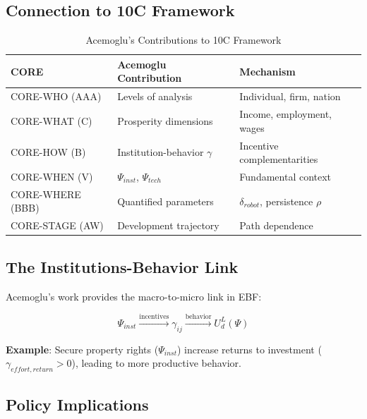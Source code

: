 \subsection{Connection to 10C Framework}

\begin{table}[h]
\centering
\caption{Acemoglu's Contributions to 10C Framework}
\label{tab:acemoglu-9c}
\begin{tabular}{lll}
\toprule
\textbf{CORE} & \textbf{Acemoglu Contribution} & \textbf{Mechanism} \\
\midrule
CORE-WHO (AAA) & Levels of analysis & Individual, firm, nation \\
CORE-WHAT (C) & Prosperity dimensions & Income, employment, wages \\
CORE-HOW (B) & Institution-behavior $\gamma$ & Incentive complementarities \\
CORE-WHEN (V) & $\Psi_{inst}$, $\Psi_{tech}$ & Fundamental context \\
CORE-WHERE (BBB) & Quantified parameters & $\delta_{robot}$, persistence $\rho$ \\
CORE-STAGE (AW) & Development trajectory & Path dependence \\
\bottomrule
\end{tabular}
\end{table}

\subsection{The Institutions-Behavior Link}

Acemoglu's work provides the macro-to-micro link in EBF:

\begin{equation}
\Psi_{inst} \xrightarrow{\text{incentives}} \gamma_{ij} \xrightarrow{\text{behavior}} U^L_d(\Psi)
\end{equation}

\textbf{Example}: Secure property rights ($\Psi_{inst}$) increase returns to investment ($\gamma_{effort,return} > 0$), leading to more productive behavior.

\subsection{Policy Implications}

